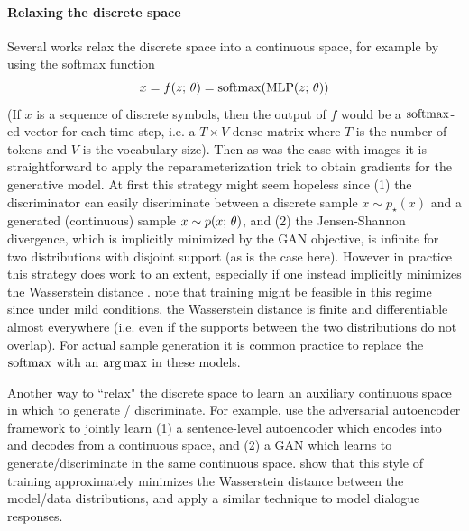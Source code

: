 \documentclass{article}
\begin{document}
\paragraph{Relaxing the discrete space} Several works \citep{Gulrajani2017wgan,Rajeswar2017,Press2017} relax the discrete space into a continuous space, for example by using the softmax function
\[ x = f(z ; \, \theta) = \operatorname*{softmax}(\operatorname*{MLP}(z ; \, \theta)) \]
(If $x$ is a sequence of discrete symbols, then the output of $f$ would be a $\operatorname*{softmax}$-ed vector for each time step, i.e. a $T \times V$ dense matrix where $T$ is the number of tokens and $V$ is the vocabulary size).
Then as was the case with images it is straightforward to apply the reparameterization trick to obtain gradients for the generative model. At first this strategy might seem hopeless 
since (1) the discriminator can easily discriminate between a discrete sample $x \sim p_\star(x)$
and a generated (continuous) sample $x \sim p(x ; \, \theta)$, and (2) the Jensen-Shannon divergence, which is implicitly minimized by the GAN objective, is infinite for two distributions with disjoint support (as is the case here). However in practice this strategy does work to an extent, especially if one instead implicitly minimizes the Wasserstein distance \citep{arjovsky2017wasserstein}. 
\cite{Gulrajani2017wgan} note that training might be feasible in this regime since 
under mild conditions, the Wasserstein distance 
is finite and differentiable almost everywhere (i.e. even if the supports between the two distributions do not overlap).  For actual sample generation it is common practice to replace the $\operatorname*{softmax}$ with an $\argmax$ in these models. 

Another way to ``relax"  the discrete space to learn an auxiliary continuous space in which to generate / discriminate. For example, \cite{zhao2017adversarially} use the adversarial autoencoder framework \citep{Makhzani2015} to jointly learn (1) a sentence-level autoencoder which encodes into and decodes from a continuous space, and (2) a GAN which learns to generate/discriminate in the same continuous space. \cite{tolstikhin2017wasserstein} show that this style of training approximately minimizes the Wasserstein distance between the model/data distributions, and \cite{gu2018dialog} apply a similar technique to model dialogue responses.
\end{document}
